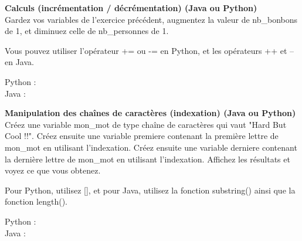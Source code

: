 \begin{Exercice}[20 minutes] \textbf{Calculs (incrémentation / décrémentation) (Java ou Python)}\\
   Gardez vos variables de l'exercice précédent, augmentez la valeur de nb\_bonbons de 1, et diminuez celle de nb\_personnes de 1.  \\
   
    \begin{conseil}
      	Vous pouvez utiliser l'opérateur += ou -= en Python, et les opérateurs ++ et -- en Java.
        
    \end{conseil}
    \begin{solution}
    
    Python : \\
    
    
    
    Java : \\
    
    
           
    \end{solution}   
\end{Exercice}

\begin{Exercice}[20 minutes] \textbf{Manipulation des chaînes de caractères (indexation) (Java ou Python)}\\
   Créez une variable mon\_mot de type chaîne de caractères qui vaut "Hard But Cool !!". Créez ensuite une variable premiere contenant la première lettre de mon\_mot en utilisant l'indexation. Créez ensuite une variable derniere contenant la dernière lettre de mon\_mot en utilisant l'indexation. Affichez les résultats et voyez ce que vous obtenez. \\
   
    \begin{conseil}
      	Pour Python, utilisez [], et pour Java, utilisez la fonction substring() ainsi que la fonction length().
        
    \end{conseil}
    \begin{solution}
    
    Python : \\
    
    
    
    Java : \\
    
    
           
    \end{solution}   
\end{Exercice}

